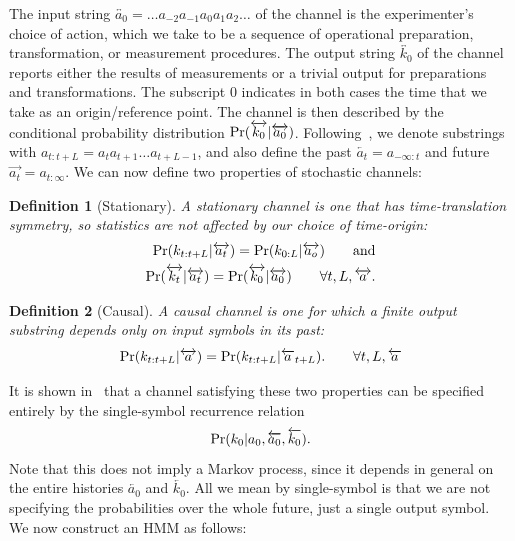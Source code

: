 \documentclass[%
 reprint,
superscriptaddress,
nofootinbib,
 amsmath,amssymb,
 prx, 
 accepted=2019-09-27,
]{quantumarticle}
\newtheorem{definition}{Definition}
\newcommand{\olra}{\overleftrightarrow}
\newcommand{\ola}{\overleftarrow}
\newcommand{\ora}{\overrightarrow}
\renewcommand{\Pr}{\textup{Pr}}
\begin{document}
The input string $\olra{a_0}=\ldots a_{-2}a_{-1}a_0a_1a_2\ldots$ of
the channel is the experimenter's choice of action, which we take to
be a sequence of operational preparation, transformation, or
measurement procedures.  The output string $\olra{k_0}$ of the channel
reports either the results of measurements or a trivial output for
preparations and transformations. The subscript $0$ indicates in both
cases the time that we take as an origin/reference point. The channel
is then described by the conditional probability distribution
$\Pr(\olra{k_0}|\olra{a_0})$. Following~\cite{BarnettComputationalMechanicsInputOutput2015},
we denote substrings with $a_{t:t+L}=a_ta_{t+1}\ldots a_{t+L-1}$, and
also define the past $\ola{a_t}=a_{-\infty:t}$ and future
$\ora{a_t}=a_{t:\infty}$. We can now define two properties of
stochastic channels:
\begin{definition}[Stationary]
  \label{def:stationary}
  A \emph{stationary} channel is one that has time-translation
  symmetry, so statistics are not affected by our choice of
  time-origin:
  \begin{align}
    \label{eq:34}
    \Pr(k_{t:t+L}|\olra{a_t})=\Pr(k_{0:L}|\olra{a_o}) \qquad \text{and} \nonumber\\
    \Pr(\olra{k_t}|\olra{a_t})= \Pr(\olra{k_0}|\olra{a_0}) \qquad\forall t,L,\olra{a}.
  \end{align}
\end{definition}
\begin{definition}[Causal]
  \label{def:causal}
  A \emph{causal} channel is one for which a finite output substring
  depends only on input symbols in its past:
  \begin{equation}
    \Pr(k_{t:t+L}|\olra{a}) = \Pr(k_{t:t+L}|\ola a_{t+L}).\qquad\forall t,L,\ola{a}\label{eq:35}
  \end{equation}
\end{definition}
It is shown in~\cite{BarnettComputationalMechanicsInputOutput2015}
that a channel satisfying these two properties can be specified
entirely by the single-symbol recurrence relation
\begin{equation}
\label{eq:29}
  \Pr(k_0|a_0,\ola{a_0}, \ola{k_0}).
\end{equation}
Note that this does not imply a Markov process, since it depends in
general on the entire histories $\ola{a_0}$ and $\ola{k_0}$. All we
mean by single-symbol is that we are not specifying the probabilities
over the whole future, just a single output symbol. We now construct
an HMM as follows:
\end{document}

